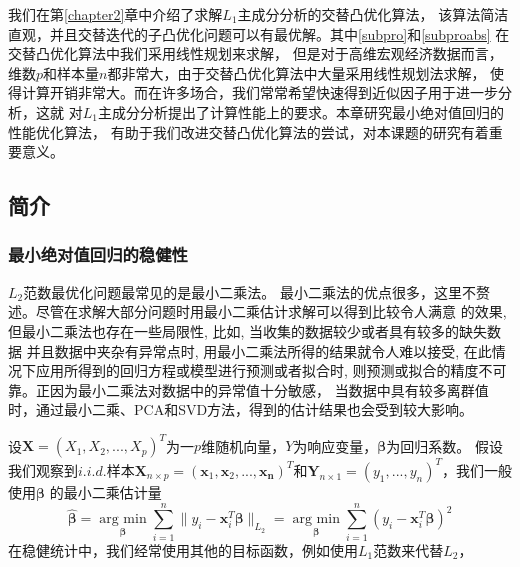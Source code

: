 我们在第\ref{chapter2}章中介绍了求解$L_1$主成分分析的交替凸优化算法，
该算法简洁直观，并且交替迭代的子凸优化问题可以有最优解。其中\eqref{subpro}和\eqref{subproabs}
在交替凸优化算法中我们采用线性规划来求解，
但是对于高维宏观经济数据而言，维数$p$和样本量$n$都非常大，由于交替凸优化算法中大量采用线性规划法求解，
使得计算开销非常大。而在许多场合，我们常常希望快速得到近似因子用于进一步分析，这就
对$L_1$主成分分析提出了计算性能上的要求。本章研究最小绝对值回归的性能优化算法，
有助于我们改进交替凸优化算法的尝试，对本课题的研究有着重要意义。


\subsection{简介}
\subsubsection{最小绝对值回归的稳健性}

$L_2$范数最优化问题最常见的是最小二乘法。
最小二乘法的优点很多，这里不赘述。尽管在求解大部分问题时用最小二乘估计求解可以得到比较令人满意
的效果, 但最小二乘法也存在一些局限性, 比如, 当收集的数据较少或者具有较多的缺失数据
并且数据中夹杂有异常点时, 用最小二乘法所得的结果就令人难以接受, 在此情况下应用所得到的回归方程或模型进行预测或者拟合时, 
则预测或拟合的精度不可靠。正因为最小二乘法对数据中的异常值十分敏感，
当数据中具有较多离群值时，通过最小二乘、PCA和SVD方法，得到的估计结果也会受到较大影响。

设$\bm{X} = (X_1, X_2, ..., X_p)^T$为一$p$维随机向量，$Y$为响应变量，$\bm{\beta}$为回归系数。
假设我们观察到$i.i.d. $样本$\bm{X}_{n\times p} = (\bm{x}_1, \bm{x}_2, ..., \bm{x_n})^T$和$\bm{Y}_{n\times1}=
(y_1, ..., y_n)^T$，我们一般使用$\bm{\beta}$
的最小二乘估计量
\begin{equation}\label{l2loss}
\hat{\bm{\beta}} = \underset{\bm{\beta}}{\operatorname{arg\ min}} \sum_{i=1}^n\|y_i - \bm{x}^T_i\bm{\beta}\|_{L_2}
=\underset{\bm{\beta}}{\operatorname{arg\ min}} \sum_{i=1}^n(y_i - \bm{x}^T_i\bm{\beta})^2
\end{equation}
在稳健统计中，我们经常使用其他的目标函数，例如使用$L_1$范数来代替$L_2$，

